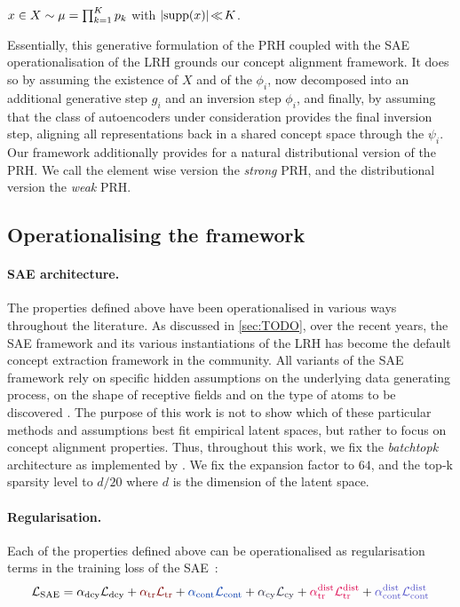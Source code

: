 \documentclass{article}
\begin{document}
\begin{hypothesis}
\label{hyp:sparse_inversion}
$x \in X \sim \mu=\prod_{k=1}^{K}p_{k}$ with $|\mathrm{supp}(x)|\!\ll\!K$.
\end{hypothesis}

Essentially, this generative formulation of the PRH coupled with the SAE operationalisation of the LRH grounds our concept alignment framework. It does so by assuming the existence of $X$ and of the $\phi_i$, now decomposed into an additional generative step $g_i$ and an inversion step $\phi_i$, and finally, by assuming that the class of autoencoders under consideration provides the final inversion step, aligning all representations back in a shared concept space through the $\psi_i$. Our framework additionally provides for a natural distributional version of the PRH. We call the element wise version the \emph{strong} PRH, and the distributional version the \emph{weak} PRH.

\subsection{Operationalising the framework}

\paragraph{SAE architecture.} The properties defined above have been operationalised in various ways throughout the literature. As discussed in \cref{sec:TODO}, over the recent years, the SAE framework and its various instantiations of the LRH has become the default concept extraction framework in the community. All variants of the SAE framework rely on specific hidden assumptions on the underlying data generating process, on the shape of receptive fields and on the type of atoms to be discovered \citep{TODO:archetypal,crossmodal}. The purpose of this work is not to show which of these particular methods and assumptions best fit empirical latent spaces, but rather to focus on concept alignment properties. Thus, throughout this work, we fix the \emph{batchtopk} architecture \citep{TODO} as implemented by \citet{TODO:overcomplete}. We fix the expansion factor to $64$, and the top-k sparsity level to $d/20$ where $d$ is the dimension of the latent space.

\paragraph{Regularisation.} Each of the properties defined above can be operationalised as regularisation terms in the training loss of the SAE~:
%
\begin{align}
\label{eq:loss}
\mathcal{L}_{\mathrm{SAE}} = \alpha_{\mathrm{dcy}} \Ldcy + \trcolor{\alpha_{\mathrm{tr}}} \Ltr + \contcolor{\alpha_{\mathrm{cont}}} \Lcont + \cycolor{\alpha_{\mathrm{cy}}} \Lcy + \trdistcolor{\alpha^{\mathrm{dist}}_{\mathrm{tr}}} \Ltrdist + \contdistcolor{\alpha^{\mathrm{dist}}_{\mathrm{cont}}} \Lcontdist
\end{align}
\end{document}
